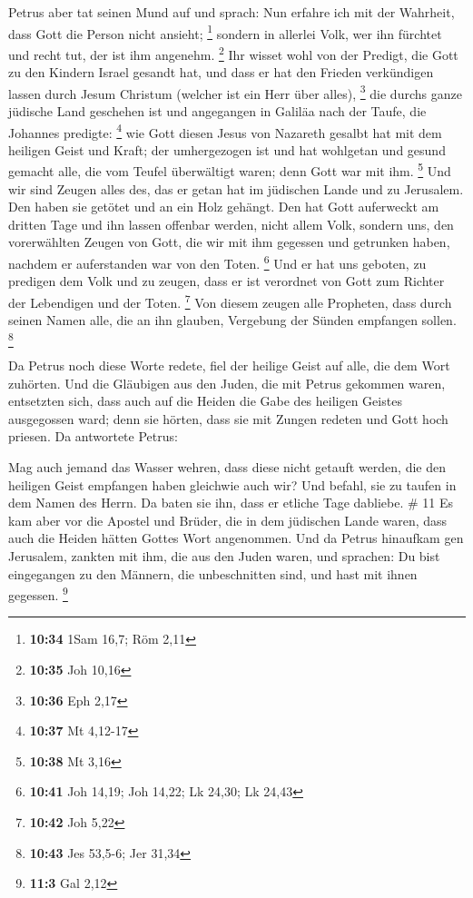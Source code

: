  Petrus aber tat seinen Mund auf und sprach: Nun erfahre
ich mit der Wahrheit, dass Gott die Person nicht ansieht; \footnote{\textbf{10:34}
  1Sam 16,7; Röm 2,11}  sondern in allerlei Volk, wer ihn
fürchtet und recht tut, der ist ihm angenehm. \footnote{\textbf{10:35}
  Joh 10,16}  Ihr wisset wohl von der Predigt, die Gott
zu den Kindern Israel gesandt hat, und dass er hat den Frieden
verkündigen lassen durch Jesum Christum (welcher ist ein Herr über
alles), \footnote{\textbf{10:36} Eph 2,17}  die durchs
ganze jüdische Land geschehen ist und angegangen in Galiläa nach der
Taufe, die Johannes predigte: \footnote{\textbf{10:37} Mt 4,12-17}
 wie Gott diesen Jesus von Nazareth gesalbt hat mit dem
heiligen Geist und Kraft; der umhergezogen ist und hat wohlgetan und
gesund gemacht alle, die vom Teufel überwältigt waren; denn Gott war mit
ihm. \footnote{\textbf{10:38} Mt 3,16}  Und wir sind
Zeugen alles des, das er getan hat im jüdischen Lande und zu Jerusalem.
Den haben sie getötet und an ein Holz gehängt.  Den hat
Gott auferweckt am dritten Tage und ihn lassen offenbar werden,
 nicht allem Volk, sondern uns, den vorerwählten Zeugen
von Gott, die wir mit ihm gegessen und getrunken haben, nachdem er
auferstanden war von den Toten. \footnote{\textbf{10:41} Joh 14,19; Joh
  14,22; Lk 24,30; Lk 24,43}  Und er hat uns geboten, zu
predigen dem Volk und zu zeugen, dass er ist verordnet von Gott zum
Richter der Lebendigen und der Toten. \footnote{\textbf{10:42} Joh 5,22}
 Von diesem zeugen alle Propheten, dass durch seinen
Namen alle, die an ihn glauben, Vergebung der Sünden empfangen sollen.
\footnote{\textbf{10:43} Jes 53,5-6; Jer 31,34}

 Da Petrus noch diese Worte redete, fiel der heilige
Geist auf alle, die dem Wort zuhörten.  Und die Gläubigen
aus den Juden, die mit Petrus gekommen waren, entsetzten sich, dass auch
auf die Heiden die Gabe des heiligen Geistes ausgegossen ward;
 denn sie hörten, dass sie mit Zungen redeten und Gott
hoch priesen. Da antwortete Petrus:

 Mag auch jemand das Wasser wehren, dass diese nicht
getauft werden, die den heiligen Geist empfangen haben gleichwie auch
wir?  Und befahl, sie zu taufen in dem Namen des Herrn.
Da baten sie ihn, dass er etliche Tage dabliebe. \# 11  Es
kam aber vor die Apostel und Brüder, die in dem jüdischen Lande waren,
dass auch die Heiden hätten Gottes Wort angenommen.  Und
da Petrus hinaufkam gen Jerusalem, zankten mit ihm, die aus den Juden
waren,  und sprachen: Du bist eingegangen zu den Männern,
die unbeschnitten sind, und hast mit ihnen gegessen. \footnote{\textbf{11:3}
  Gal 2,12}

